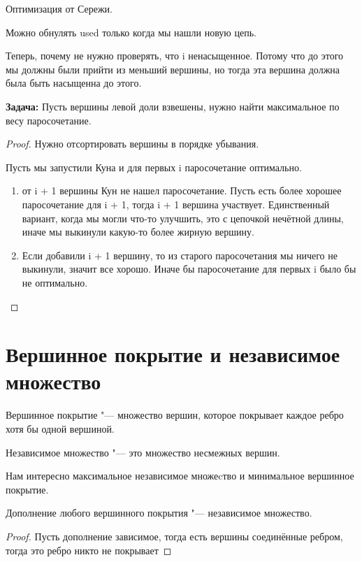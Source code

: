 Оптимизация от Сережи.

Можно обнулять used только когда мы нашли новую цепь.  

Теперь, почему не нужно проверять, что i ненасыщенное. Потому что до этого мы должны были прийти из меньший вершины, 
но тогда эта вершина должна была быть насыщенна до этого. 


\textbf{Задача:} Пусть вершины левой доли взвешены, нужно найти максимальное по весу паросочетание. 

\begin{proof}
Нужно отсортировать вершины в порядке убывания. 

Пусть мы запустили Куна и для первых i паросочетание оптимально. 
\begin{enumerate}
    \item от i + 1 вершины Кун не нашел паросочетание. Пусть есть более хорошее паросочетание для i + 1,
    тогда i + 1  вершина участвует. Единственный вариант, когда мы могли что-то улучшить, это с цепочкой нечётной длины,
    иначе мы выкинули какую-то более жирную вершину.  
    \item Если добавили i + 1 вершину, то из старого паросочетания мы ничего не выкинули, значит все хорошо. Иначе бы паросочетание для первых i 
    было бы не оптимально. 
\end{enumerate}
\end{proof}

\section{Вершинное покрытие и независимое множество}
\begin{Def}
Вершинное покрытие "--- множество вершин, которое покрывает каждое ребро хотя бы одной вершиной.
\end{Def}
\begin{Def}
Независимое множество "--- это множество несмежных вершин.
\end{Def}

Нам интересно максимальное независимое множеcтво и минимальное вершинное покрытие.

\begin{theorem}{}
Дополнение любого вершинного покрытия "--- независимое множество.
\end{theorem}
\begin{proof}
Пусть дополнение зависимое, тогда есть вершины соединённые ребром, тогда это ребро 
никто не покрывает
\end{proof}

